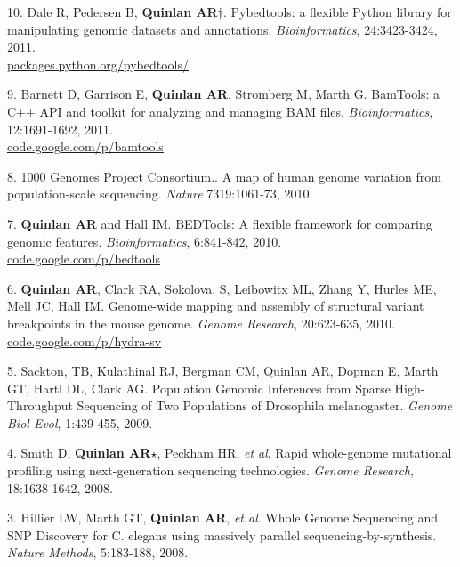 \documentclass[margin,line]{cv}
\begin{document}
\begin{resume}
\begin{list}{*}{}
    \item[10.] Dale R, Pedersen B, \textbf{Quinlan AR}$\dagger$. 
    Pybedtools: a flexible Python library for manipulating genomic datasets and annotations. 
    \textit{Bioinformatics}, 24:3423-3424, 2011.\\
    \url{packages.python.org/pybedtools/}
    
    \item[9.] Barnett D, Garrison E, \textbf{Quinlan AR}, Stromberg M, Marth G.
    BamTools: a C++ API and toolkit for analyzing and managing BAM files.
    \textit{Bioinformatics}, 12:1691-1692, 2011.\\
    \url{code.google.com/p/bamtools}

    \item[8.] 1000 Genomes Project Consortium.. 
    A map of human genome variation from population-scale sequencing. 
    \textit{Nature} 7319:1061-73, 2010.

    \item[7.] \textbf{Quinlan AR} and Hall IM.
    BEDTools: A flexible framework for comparing genomic features. 
    \textit{Bioinformatics}, 6:841-842, 2010.\\
    \url{code.google.com/p/bedtools}

    \item[6.] \textbf{Quinlan AR}, Clark RA, Sokolova, S, Leibowitx ML, Zhang Y, Hurles ME, Mell JC, Hall IM. 
    Genome-wide mapping and assembly of structural variant breakpoints in the mouse genome. 
    \textit{Genome Research}, 20:623-635, 2010.\\
    \url{code.google.com/p/hydra-sv}

    \item[5.] Sackton, TB, Kulathinal RJ, Bergman CM, Quinlan AR, Dopman E, Marth GT, Hartl DL, Clark AG. 
    Population Genomic Inferences from Sparse High-Throughput Sequencing of Two Populations of Drosophila melanogaster. 
    \textit{Genome Biol Evol}, 1:439-455, 2009.

    \item[4.] Smith D, \textbf{Quinlan AR}$\star$, Peckham HR, \textit{et al}. 
    Rapid whole-genome mutational profiling using next-generation sequencing technologies. 
    \textit{Genome Research}, 18:1638-1642, 2008.

    \item[3.] Hillier LW, Marth GT, \textbf{Quinlan AR}, \textit{et al}. 
    Whole Genome Sequencing and SNP Discovery for C. elegans using massively parallel sequencing-by-synthesis. 
    \textit{Nature Methods}, 5:183-188, 2008.
    

\end{list}
\end{resume}
\end{document}
